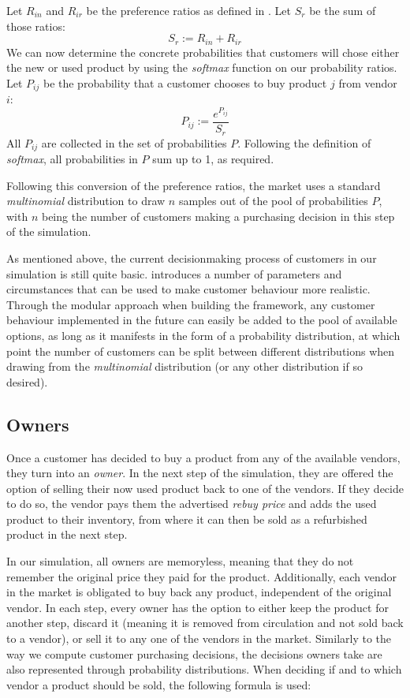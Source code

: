 \begin{definition}\label{def:customerSoftmax}
	Let \(R_{in}\) and \(R_{ir}\) be the preference ratios as defined in . Let \(S_{r}\) be the sum of those ratios:
	\[
		S_{r} := R_{in} + R_{ir}
	\]
	We can now determine the concrete probabilities that customers will chose either the new or used product by using the \emph{softmax} function on our probability ratios. Let \(P_{ij}\) be the probability that a customer chooses to buy product \(j\) from vendor \(i\):
	\[
		P_{ij} := \frac{e^{P_{ij}}}{S_{r}}
	\]
	All \(P_{ij}\) are collected in the set of probabilities \(P\). Following the definition of \emph{softmax}, all probabilities in \(P\) sum up to 1, as required.
\end{definition}

Following this conversion of the preference ratios, the market uses a standard \emph{multinomial} distribution to draw \(n\) samples out of the pool of probabilities \(P\), with \(n\) being the number of customers making a purchasing decision in this step of the simulation.

As mentioned above, the current decisionmaking process of customers in our simulation is still quite basic.  introduces a number of parameters and circumstances that can be used to make customer behaviour more realistic. Through the modular approach when building the framework, any customer behaviour implemented in the future can easily be added to the pool of available options, as long as it manifests in the form of a probability distribution, at which point the number of customers can be split between different distributions when drawing from the \emph{multinomial} distribution (or any other distribution if so desired).

\subsection{Owners}

Once a customer has decided to buy a product from any of the available vendors, they turn into an \emph{owner}. In the next step of the simulation, they are offered the option of selling their now used product back to one of the vendors. If they decide to do so, the vendor pays them the advertised \emph{rebuy price} and adds the used product to their inventory, from where it can then be sold as a refurbished product in the next step.

In our simulation, all owners are memoryless, meaning that they do not remember the original price they paid for the product. Additionally, each vendor in the market is obligated to buy back any product, independent of the original vendor. In each step, every owner has the option to either keep the product for another step, discard it (meaning it is removed from circulation and not sold back to a vendor), or sell it to any one of the vendors in the market. Similarly to the way we compute customer purchasing decisions, the decisions owners take are also represented through probability distributions. When deciding if and to which vendor a product should be sold, the following formula is used:

